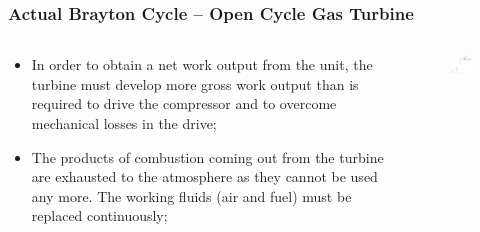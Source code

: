 \documentclass[10pt,compress]{beamer}
\begin{document}
\begin{frame}
 \frametitle{Actual Brayton Cycle -- Open Cycle Gas Turbine}
 \begin{columns}
  \begin{column}[c]{0.4\linewidth} 
 \begin{itemize}
  \item <1-> In order to obtain a net work output from the unit, the turbine must develop more gross work output than is required to drive the compressor and to overcome mechanical losses in the drive;
  \item <2-> The products of combustion coming out from the turbine are exhausted to the atmosphere as they cannot be used any more. The working fluids (air and fuel) must be replaced continuously;
 \end{itemize}
  \end{column}
  \begin{column}[c]{0.6\linewidth}
    \begin{center}
   \begin{figure}%
     \includegraphics[height=6.cm,width=6.5cm,clip]{./Pics/Brayton_cycle3}
   \end{figure}  
    \end{center}
  \end{column}  
 \end{columns}

\end{frame}
\end{document}
